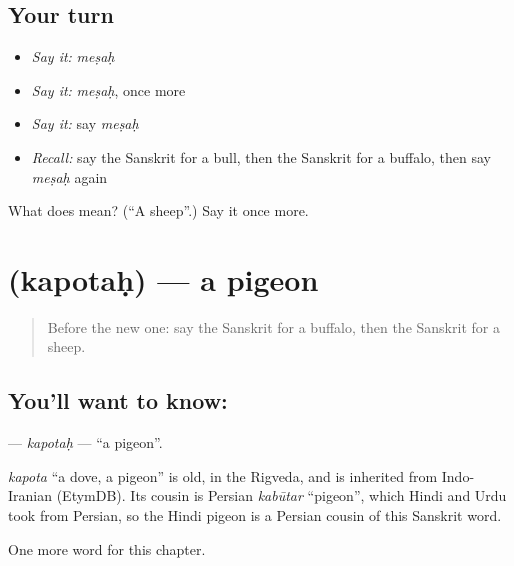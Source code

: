 \subsection*{Your turn}
\begin{itemize}
\raggedright
  \item \emph{Say it:} \emph{meṣaḥ}
  \item \emph{Say it:} \emph{meṣaḥ}, once more
  \item \emph{Say it:} say \emph{meṣaḥ}
  \item \emph{Recall:} say the Sanskrit for a bull, then the Sanskrit for a buffalo, then say \emph{meṣaḥ} again
\end{itemize}

\begin{tcolorbox}[breakable,colback=teal!4,colframe=teal!35!black,title={Before you move on}]
What does  mean? (\textquotedblleft{}A sheep\textquotedblright{}.) Say it once more.
\end{tcolorbox}
\section[\texorpdfstring{\sk{कपोतः} (kapotaḥ)}{कपोतः (kapotaḥ)}]{ (kapotaḥ) — a pigeon}

\label{lesson:SA-C114-kapotah}



\begin{quote}
Before the new one: say the Sanskrit for a buffalo, then the Sanskrit for a sheep.
\end{quote}

\subsection*{You'll want to know: }
\textbf{} — \emph{kapotaḥ} — \textquotedblleft{}a pigeon\textquotedblright{}.

\begin{cousinweb}
\emph{kapota} \textquotedblleft{}a dove, a pigeon\textquotedblright{} is old, in the Rigveda, and is inherited from Indo-Iranian (EtymDB). Its cousin is Persian \emph{kabūtar} \textquotedblleft{}pigeon\textquotedblright{}, which Hindi and Urdu took from Persian, so the Hindi pigeon is a Persian cousin of this Sanskrit word.
\end{cousinweb}

\begin{grammarlens}[title={What you've built}]
One more word for this chapter.
\end{grammarlens}

